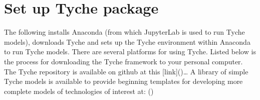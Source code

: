 \documentclass[letterpaper,10pt,english]{sphinxmanual}
\begin{document}
\section{Set up Tyche package}
\label{\detokenize{cheat-sheet:set-up-tyche-package}}
The following installs Anaconda (from which JupyterLab is used to run Tyche models), downloads Tyche and sets up the Tyche environment within Anaconda to run Tyche models.  There are several platforms for using Tyche.  Listed below is the process for downloading the Tyche framework to your personal computer. The Tyche repository is available on github at this {[}link{]}()…   A library of simple Tyche models is available to provide beginning templates for developing more complete models of technologies of interest at: ()
\end{document}

